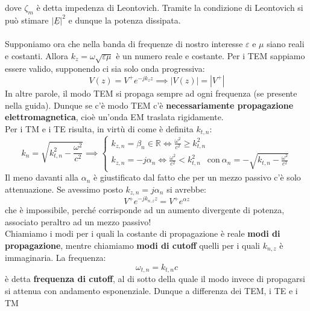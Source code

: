 \documentclass{book}
\begin{document}
    dove $\zeta_{m}$ è detta impedenza di Leontovich. Tramite la condizione di Leontovich si può stimare $|\underline{E}|^{2}$ e dunque 
    la potenza dissipata. \\ \\
    Supponiamo ora che nella banda di frequenze di nostro interesse $\varepsilon$ e $\mu$ siano reali e costanti. Allora $k_{z} = \omega \sqrt{\varepsilon \mu}$ è un numero 
    reale e costante. Per i TEM sappiamo essere valido, supponendo ci sia solo onda progressiva:
    \begin{equation}
        V(z) = V^{+}e^{-jk_{z} z} \implies |V(z)| = |V^{+}|
    \end{equation}
    In altre parole, il modo TEM si propaga sempre ad ogni frequenza (se presente nella guida). Dunque se c'è modo TEM c'è \textbf{necessariamente propagazione elettromagnetica}, 
    cioè un'onda EM traslata rigidamente. \\
    Per i TM e i TE risulta, in virtù di come è definita $k_{t,n}$:
    \begin{equation}
        k_{n} = \sqrt{k_{t,n} ^{2} - \frac{\omega ^{2}}{c^{2}}} \implies 
        \begin{cases}
        k_{z,n} = \beta_{n} \in \mathbb{R} \iff \frac{\omega ^{2}}{c^{2}} \geq k_{t,n} ^{2} \\
        k_{z,n} = -j \alpha_{n} \iff \frac{\omega ^{2}}{c^{2}} < k_{t,n} ^{2} \ \ \textrm{ con} \ \alpha_{n} = - \sqrt{k_{t,n} - \frac{\omega ^{2}}{c^{2}}}
    \end{cases}
    \end{equation}
    Il meno davanti alla $\alpha_{n}$ è giustificato dal fatto che per un mezzo passivo c'è solo attenuazione. Se avessimo posto $k_{z,n} = j \alpha_{n}$ si avrebbe:
    \begin{equation}
        V^{+}e^{-jk_{n,z}z} = V^{+}e^{\alpha z}
    \end{equation}
    che è impossibile, perché corrisponde ad un aumento divergente di potenza, associato peraltro ad un mezzo passivo! \\
    Chiamiamo i modi per i quali la costante di propagazione è reale \textbf{modi di propagazione}, mentre chiamiamo \textbf{modi di cutoff} quelli 
    per i quali $k_{n,z}$ è immaginaria. La frequenza:
    \begin{equation}
        \omega_{t,n} = k_{t,n} c 
    \end{equation}
    è detta \textbf{frequenza di cutoff}, al di sotto della quale il modo invece di propagarsi si attenua con andamento esponenziale. Dunque a differenza dei TEM, i TE e i TM 
\end{document}

